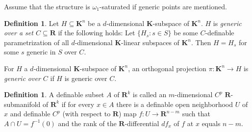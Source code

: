 \documentclass{amsart}
\newtheorem{lemma}[theorem]{Lemma}
\theoremstyle{definition}
\newtheorem{definition}[theorem]{Definition}
\numberwithin{equation}{section}
\begin{document}


Assume that the structure is $\omega_1$-saturated if generic points are mentioned.

\begin{definition}
  Let $H \subseteq \mathbf{K}^n$ be a $d$-dimensional $\mathbf{K}$-subspace of $\mathbf{K}^n$.
  $H$ is \emph{generic over a set $C \subseteq \mathbf{R}$} if the following holds:
  Let $\{H_s: s \in S\}$ be some $C$-definable parametrization of all $d$-dimensional $\mathbf{K}$-linear subspaces of $\mathbf{K}^n$.
  Then $H = H_s$ for some $s$ generic in $S$ over $C$.
\end{definition}

For $H$ a $d$-dimensional $\mathbf{K}$-subspace of $\mathbf{K}^n$,
an orthogonal projection $\pi:\mathbf{K}^n \to H$ is \emph{generic over $C$} if $H$ is generic over $C$.

\begin{definition}
  A definable subset $A$ of $\mathbf{R}^k$ is called an $m$-dimensional $C^p$ $\mathbf{R}$-submanifold of $\mathbf{R}^k$
  if for every $x\in A$ there is a definable open neighborhood $U$ of $x$ and definable $C^p$ (with respect to $\mathbf{R}$) map
  $f: U \to \mathbf{R}^{n-m}$ such that $A \cap U = f^{-1}(0)$ and the rank of the $\mathbf{R}$-differential $df_x$ of $f$ at $x$ equals $n-m$.
\end{definition}
\end{document}
